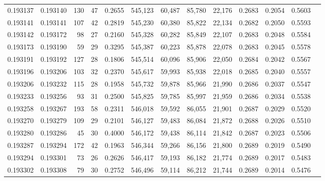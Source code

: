 \begin{tabular}{rrrrrrrrrrrrr}
0.193137 & 0.193140 &   130 &  47 &                                     0.2655 & 545,123 &  60,487 &  85,780 &  22,176 & 0.2683 & 0.2054 & 0.5603 \\
0.193141 & 0.193141 &   107 &  42 &                                     0.2819 & 545,230 &  60,380 &  85,822 &  22,134 & 0.2682 & 0.2050 & 0.5593 \\
0.193142 & 0.193172 &    98 &  27 &                                     0.2160 & 545,328 &  60,282 &  85,849 &  22,107 & 0.2683 & 0.2048 & 0.5584 \\
0.193173 & 0.193190 &    59 &  29 &                                     0.3295 & 545,387 &  60,223 &  85,878 &  22,078 & 0.2683 & 0.2045 & 0.5578 \\
0.193191 & 0.193192 &   127 &  28 &                                     0.1806 & 545,514 &  60,096 &  85,906 &  22,050 & 0.2684 & 0.2042 & 0.5567 \\
0.193196 & 0.193206 &   103 &  32 &                                     0.2370 & 545,617 &  59,993 &  85,938 &  22,018 & 0.2685 & 0.2040 & 0.5557 \\
0.193206 & 0.193232 &   115 &  28 &                                     0.1958 & 545,732 &  59,878 &  85,966 &  21,990 & 0.2686 & 0.2037 & 0.5547 \\
0.193233 & 0.193256 &    93 &  31 &                                     0.2500 & 545,825 &  59,785 &  85,997 &  21,959 & 0.2686 & 0.2034 & 0.5538 \\
0.193258 & 0.193267 &   193 &  58 &                                     0.2311 & 546,018 &  59,592 &  86,055 &  21,901 & 0.2687 & 0.2029 & 0.5520 \\
0.193270 & 0.193279 &   109 &  29 &                                     0.2101 & 546,127 &  59,483 &  86,084 &  21,872 & 0.2688 & 0.2026 & 0.5510 \\
0.193280 & 0.193286 &    45 &  30 &                                     0.4000 & 546,172 &  59,438 &  86,114 &  21,842 & 0.2687 & 0.2023 & 0.5506 \\
0.193287 & 0.193294 &   172 &  42 &                                     0.1963 & 546,344 &  59,266 &  86,156 &  21,800 & 0.2689 & 0.2019 & 0.5490 \\
0.193294 & 0.193301 &    73 &  26 &                                     0.2626 & 546,417 &  59,193 &  86,182 &  21,774 & 0.2689 & 0.2017 & 0.5483 \\
0.193302 & 0.193308 &    79 &  30 &                                     0.2752 & 546,496 &  59,114 &  86,212 &  21,744 & 0.2689 & 0.2014 & 0.5476 \\

\end{tabular}
